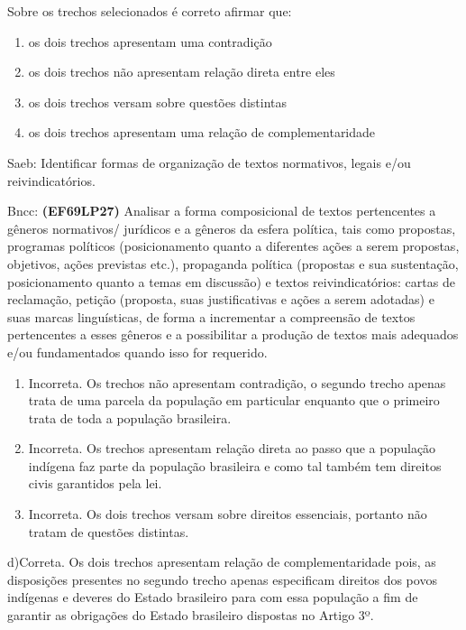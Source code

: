 {Sobre os trechos selecionados é correto afirmar que:

\begin{enumerate}
\def\labelenumi{\alph{enumi})}
\item
  os dois trechos apresentam uma contradição
\item
  os dois trechos não apresentam relação direta entre eles
\item
  os dois trechos versam sobre questões distintas
\item
  os dois trechos apresentam uma relação de complementaridade
\end{enumerate}

Saeb: Identificar formas de organização de textos normativos, legais
e/ou reivindicatórios.

Bncc: \textbf{(EF69LP27)} Analisar a forma composicional de textos
pertencentes a gêneros normativos/ jurídicos e a gêneros da esfera
política, tais como propostas, programas políticos (posicionamento
quanto a diferentes ações a serem propostas, objetivos, ações previstas
etc.), propaganda política (propostas e sua sustentação, posicionamento
quanto a temas em discussão) e textos reivindicatórios: cartas de
reclamação, petição (proposta, suas justificativas e ações a serem
adotadas) e suas marcas linguísticas, de forma a incrementar a
compreensão de textos pertencentes a esses gêneros e a possibilitar a
produção de textos mais adequados e/ou fundamentados quando isso for
requerido.

\begin{enumerate}
\def\labelenumi{\arabic{enumi}.}
\item
  Incorreta. Os trechos não apresentam contradição, o segundo trecho
  apenas trata de uma parcela da população em particular enquanto que o
  primeiro trata de toda a população brasileira.
\item
  Incorreta. Os trechos apresentam relação direta ao passo que a
  população indígena faz parte da população brasileira e como tal também
  tem direitos civis garantidos pela lei.
\item
  Incorreta. Os dois trechos versam sobre direitos essenciais, portanto
  não tratam de questões distintas.
\end{enumerate}

d)Correta. Os dois trechos apresentam relação de complementaridade pois,
as disposições presentes no segundo trecho apenas especificam direitos
dos povos indígenas e deveres do Estado brasileiro para com essa
população a fim de garantir as obrigações do Estado brasileiro dispostas
no Artigo 3º.

}
